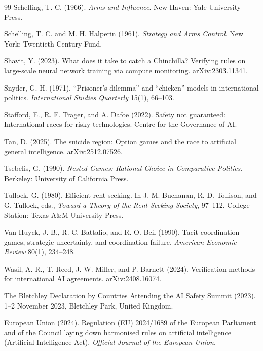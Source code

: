 \documentclass[11pt]{article}
\theoremstyle{plain}
\theoremstyle{definition}
\theoremstyle{remark}
\begin{document}
\begin{thebibliography}{99}
 Schelling, T. C. (1966). \emph{Arms and Influence}. New Haven: Yale University Press.

 Schelling, T. C. and M. H. Halperin (1961). \emph{Strategy and Arms Control}. New York: Twentieth Century Fund.

 Shavit, Y. (2023). What does it take to catch a Chinchilla? Verifying rules on large-scale neural network training via compute monitoring. arXiv:2303.11341.

 Snyder, G. H. (1971). ``Prisoner's dilemma'' and ``chicken'' models in international politics. \emph{International Studies Quarterly} 15(1), 66--103.

 Stafford, E., R. F. Trager, and A. Dafoe (2022). Safety not guaranteed: International races for risky technologies. Centre for the Governance of AI.

 Tan, D. (2025). The suicide region: Option games and the race to artificial general intelligence. arXiv:2512.07526.

 Tsebelis, G. (1990). \emph{Nested Games: Rational Choice in Comparative Politics}. Berkeley: University of California Press.

 Tullock, G. (1980). Efficient rent seeking. In J. M. Buchanan, R. D. Tollison, and G. Tullock, eds., \emph{Toward a Theory of the Rent-Seeking Society}, 97--112. College Station: Texas A\&M University Press.

 Van Huyck, J. B., R. C. Battalio, and R. O. Beil (1990). Tacit coordination games, strategic uncertainty, and coordination failure. \emph{American Economic Review} 80(1), 234--248.

 Wasil, A. R., T. Reed, J. W. Miller, and P. Barnett (2024). Verification methods for international AI agreements. arXiv:2408.16074.


 The Bletchley Declaration by Countries Attending the AI Safety Summit (2023). 1--2 November 2023, Bletchley Park, United Kingdom.

 European Union (2024). Regulation (EU) 2024/1689 of the European Parliament and of the Council laying down harmonised rules on artificial intelligence (Artificial Intelligence Act). \emph{Official Journal of the European Union}.


\end{thebibliography}
\end{document}
